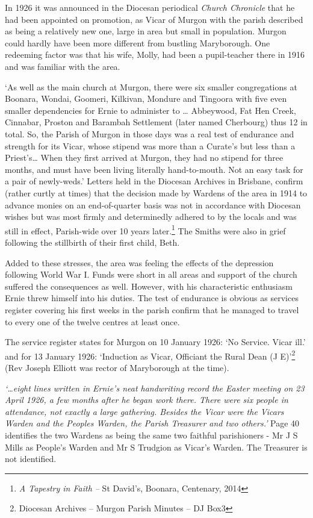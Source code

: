 In 1926 it was announced in the Diocesan periodical \emph{Church Chronicle} that he had been appointed on promotion, as Vicar of Murgon with the parish described as being a relatively new one, large in area but small in population. Murgon could hardly have been more different from bustling Maryborough. One redeeming factor was that his wife, Molly, had been a pupil-teacher there in 1916 and was familiar with the area.

`As well as the main church at Murgon, there were six smaller congregations at Boonara, Wondai, Goomeri, Kilkivan, Mondure and Tingoora with five even smaller dependencies for Ernie to administer to \ldots{} Abbeywood, Fat Hen Creek, Cinnabar, Proston and Barambah Settlement (later named Cherbourg) thus 12 in total. So, the Parish of Murgon in those days was a real test of endurance and strength for its Vicar, whose stipend was more than a Curate's but less than a Priest's\ldots{} When they first arrived at Murgon, they had no stipend for three months, and must have been living literally hand-to-mouth. Not an easy task for a pair of newly-weds.' Letters held in the Diocesan Archives in Brisbane, confirm (rather curtly at times) that the decision made by Wardens of the area in 1914 to advance monies on an end-of-quarter basis was not in accordance with Diocesan wishes but was most firmly and determinedly adhered to by the locals and was still in effect, Parish-wide over 10 years later.\footnote{\emph{A Tapestry in Faith --} St David's, Boonara, Centenary, 2014} The Smiths were also in grief following the stillbirth of their first child, Beth.

Added to these stresses, the area was feeling the effects of the depression following World War I. Funds were short in all areas and support of the church suffered the consequences as well. However, with his characteristic enthusiasm Ernie threw himself into his duties. The test of endurance is obvious as services register covering his first weeks in the parish confirm that he managed to travel to every one of the twelve centres at least once.

The service register states for Murgon on 10 January 1926: `No Service. Vicar ill.' and for 13 January 1926: `Induction as Vicar, Officiant the Rural Dean (J E)'\footnote{Diocesan Archives -- Murgon Parish Minutes -- DJ Box3} (Rev Joseph Elliott was rector of Maryborough at the time).

\emph{`\ldots eight lines written in Ernie's neat handwriting record the Easter meeting on 23 April 1926, a few months after he began work there. There were six people in attendance, not exactly a large gathering. Besides the Vicar were the Vicars Warden and the Peoples Warden, the Parish Treasurer and two others.'} Page 40 identifies the two Wardens as being the same two faithful parishioners - Mr J S Mills as People's Warden and Mr S Trudgion as Vicar's Warden. The Treasurer is not identified.

